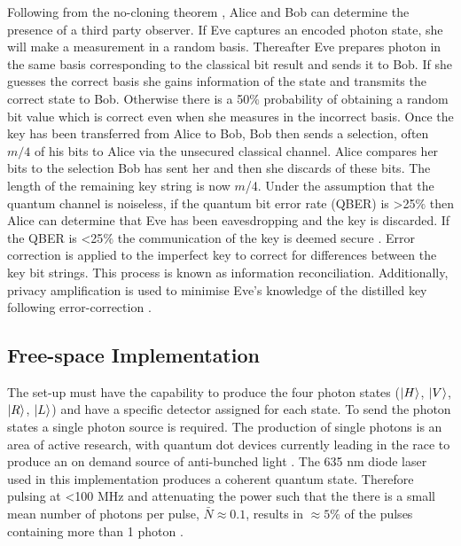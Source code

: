 Following from the no-cloning theorem \citep{Wootters1982ACloned}, Alice and Bob can determine the presence of a third party observer. If Eve captures an encoded photon state, she will make a measurement in a random basis. Thereafter Eve prepares photon in the same basis corresponding to the classical bit result and sends it to Bob. If she guesses the correct basis she gains information of the state and transmits the correct state to Bob. Otherwise there is a 50$\%$ probability of obtaining a random bit value which is correct even when she measures in the incorrect basis. Once the key has been transferred from Alice to Bob, Bob then sends a selection, often $m/4$ of his bits to Alice via the unsecured classical channel. Alice compares her bits to the selection Bob has sent her and then she discards of these bits. The length of the remaining key string is now $m$/4. Under the assumption that the quantum channel is noiseless, if the quantum bit error rate (QBER) is >25$\%$ then Alice can determine that Eve has been eavesdropping and the key is discarded. If the QBER is <25$\%$ the communication of the key is deemed secure \citep{Fox2006QuantumIntroduction,Bedington2017ProgressDistribution}. Error correction is applied to the imperfect key to correct for differences between the key bit strings. This process is known as information reconciliation. Additionally, privacy amplification is used to minimise Eve's knowledge of the distilled key following error-correction \citep{Nielsen2010QuantumInformation}. 


\subsection{Free-space Implementation} 
The set-up must have the capability to produce the four photon states ($\lvert H\rangle$, $\lvert V\rangle$, $\lvert R\rangle$, $\lvert L\rangle$) and have a specific detector assigned for each state. To send the photon states a single photon source is required. The production of single photons is an area of active research, with quantum dot devices currently leading in the race to produce an on demand source of anti-bunched light \citep{Senellart2017High-performanceSources}. The 635 nm diode laser used in this implementation produces a coherent quantum state. Therefore pulsing at <100 MHz and attenuating the power such that the there is a small mean number of photons per pulse, $\bar{N}\approx0.1$, results in $\approx 5\%$ of the pulses containing more than 1 photon \citep{Fox2006QuantumIntroduction}. 

